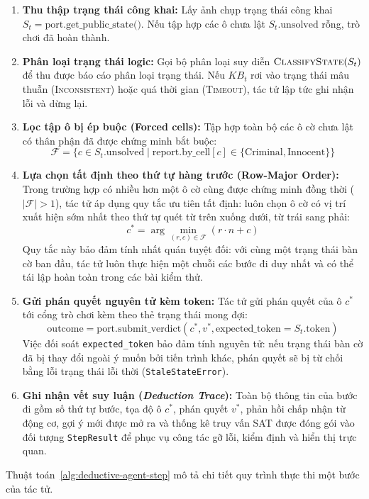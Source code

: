 \begin{enumerate}
    \item \textbf{Thu thập trạng thái công khai:} Lấy ảnh chụp trạng thái công khai $S_t = \text{port.get\_public\_state()}$. Nếu tập hợp các ô chưa lật $S_t.\text{unsolved}$ rỗng, trò chơi đã hoàn thành.
    \item \textbf{Phân loại trạng thái logic:} Gọi bộ phân loại suy diễn $\textsc{ClassifyState}(S_t)$ để thu được báo cáo phân loại trạng thái. Nếu $KB_t$ rơi vào trạng thái mâu thuẫn (\textsc{Inconsistent}) hoặc quá thời gian (\textsc{Timeout}), tác tử lập tức ghi nhận lỗi và dừng lại.
    \item \textbf{Lọc tập ô bị ép buộc (Forced cells):} Tập hợp toàn bộ các ô cờ chưa lật có thân phận đã được chứng minh bắt buộc:
    \[
    \mathcal{F} = \{c \in S_t.\text{unsolved} \mid \text{report.by\_cell}[c] \in \{\text{Criminal}, \text{Innocent}\}\}
    \]
    \item \textbf{Lựa chọn tất định theo thứ tự hàng trước (Row-Major Order):}
    Trong trường hợp có nhiều hơn một ô cờ cùng được chứng minh đồng thời ($|\mathcal{F}| > 1$), tác tử áp dụng quy tắc ưu tiên tất định: luôn chọn ô cờ có vị trí xuất hiện sớm nhất theo thứ tự quét từ trên xuống dưới, từ trái sang phải:
    \[
    c^* = \arg\min_{(r, c) \in \mathcal{F}} (r \cdot n + c)
    \]
    Quy tắc này bảo đảm tính nhất quán tuyệt đối: với cùng một trạng thái bàn cờ ban đầu, tác tử luôn thực hiện một chuỗi các bước đi duy nhất và có thể tái lập hoàn toàn trong các bài kiểm thử.
    \item \textbf{Gửi phán quyết nguyên tử kèm token:} Tác tử gửi phán quyết của ô $c^*$ tới cổng trò chơi kèm theo thẻ trạng thái mong đợi:
    \[
    \text{outcome} = \text{port.submit\_verdict}(c^*, v^*, \text{expected\_token} = S_t.\text{token})
    \]
    Việc đối soát \texttt{expected\_token} bảo đảm tính nguyên tử: nếu trạng thái bàn cờ đã bị thay đổi ngoài ý muốn bởi tiến trình khác, phán quyết sẽ bị từ chối bằng lỗi trạng thái lỗi thời (\texttt{StaleStateError}).
    \item \textbf{Ghi nhận vết suy luận (\textit{Deduction Trace}):} Toàn bộ thông tin của bước đi gồm số thứ tự bước, tọa độ ô $c^*$, phán quyết $v^*$, phản hồi chấp nhận từ động cơ, gợi ý mới được mở ra và thống kê truy vấn SAT được đóng gói vào đối tượng \texttt{StepResult} để phục vụ công tác gỡ lỗi, kiểm định và hiển thị trực quan.
\end{enumerate}

Thuật toán~\ref{alg:deductive-agent-step} mô tả chi tiết quy trình thực thi một bước của tác tử.

